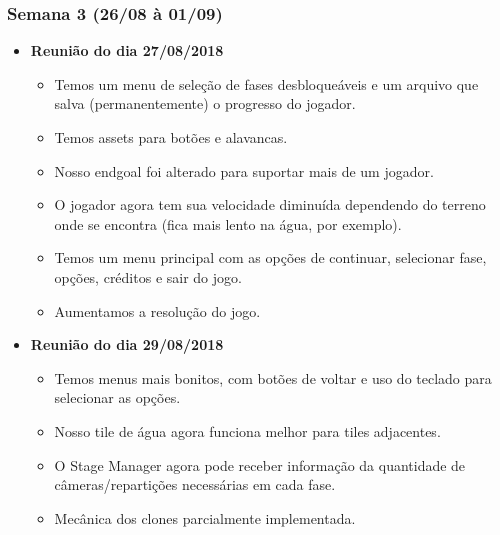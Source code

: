 \documentclass[a4paper, 11pt]{article}
\begin{document}
\subsubsection{Semana 3 (26/08 à 01/09)}
	\begin{itemize} 
		\item \textbf{Reunião do dia 27/08/2018}

		\begin{itemize}
    		\item Temos um menu de seleção de fases desbloqueáveis e um arquivo que salva (permanentemente) o progresso do jogador.
    		\item Temos assets para botões e alavancas.
    		\item Nosso endgoal foi alterado para suportar mais de um jogador.
    		\item O jogador agora tem sua velocidade diminuída dependendo do terreno onde se encontra (fica mais lento na água, por exemplo).
    		\item Temos um menu principal com as opções de continuar, selecionar fase, opções, créditos e sair do jogo.
   			\item Aumentamos a resolução do jogo.
   		\end{itemize}

		\item \textbf{Reunião do dia 29/08/2018}

		\begin{itemize}
    		\item Temos menus mais bonitos, com botões de voltar e uso do teclado para selecionar as opções.
    		\item Nosso tile de água agora funciona melhor para tiles adjacentes.
    		\item O Stage Manager agora pode receber informação da quantidade de câmeras/repartições necessárias em cada fase.
    		\item Mecânica dos clones parcialmente implementada.

		\end{itemize}

	\end{itemize}
\end{document}
